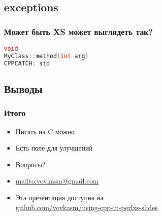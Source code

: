 \documentclass[pdflatex,hyperref={unicode=true}]{beamer}
\DeclareRobustCommand{\cpp}{
    \texorpdfstring{\hbox{C\hspace{-0.5ex}\protect\raisebox{0.5ex}{\protect\scalebox{0.67}{++}}}}{C++}
}
\begin{document}
\subsection{exceptions}
\begin{frame}[t,fragile]
    \frametitle{Может быть XS может выглядеть так?}
    \begin{lstlisting}[language=C++,style=PerlXS]
void
MyClass::method(int arg)
CPPCATCH: std
    \end{lstlisting}
\end{frame}

\subsection{Выводы}
\begin{frame}[t]
    \frametitle{Итого}
    \begin{itemize}
        \item<1-> Писать на \cpp можно
        \item<2-> Есть поле для улучшений
        \item<3-> Вопросы?
        \item<4-> \url{mailto:vovkasm@gmail.com}
        \item<4-> Эта презентация доступна на\\
            \href{https://github.com/vovkasm/using-cpp-in-perlxs-slides}{github.com/vovkasm/using-cpp-in-perlxs-slides}
    \end{itemize}
\end{frame}
\end{document}
